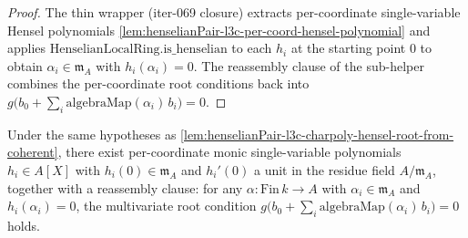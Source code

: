 \begin{proof}

\leanok
The thin wrapper (iter-069 closure) extracts per-coordinate
single-variable Hensel polynomials
\cref{lem:henselianPair-l3c-per-coord-hensel-polynomial} and
applies $\mathrm{HenselianLocalRing.is\_henselian}$ to each
$h_i$ at the starting point $0$ to obtain $\alpha_i \in
\mathfrak m_A$ with $h_i(\alpha_i) = 0$. The reassembly clause
of the sub-helper combines the per-coordinate root conditions
back into $g\bigl(b_0 + \sum_i \mathrm{algebraMap}(\alpha_i)\,
b_i\bigr) = 0$.
\end{proof}

\begin{lemma}
\label{lem:henselianPair-l3c-per-coord-hensel-polynomial}
Under the same hypotheses as
\cref{lem:henselianPair-l3c-charpoly-hensel-root-from-coherent},
there exist per-coordinate monic single-variable polynomials
$h_i \in A[X]$ with $h_i(0) \in \mathfrak m_A$ and
$h_i'(0)$ a unit in the residue field $A / \mathfrak m_A$,
together with a reassembly clause: for any
$\alpha : \mathrm{Fin}\,k \to A$ with $\alpha_i \in \mathfrak
m_A$ and $h_i(\alpha_i) = 0$, the multivariate root condition
$g\bigl(b_0 + \sum_i \mathrm{algebraMap}(\alpha_i)\,b_i\bigr) =
0$ holds.
\end{lemma}

